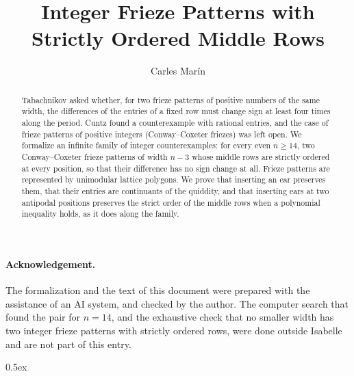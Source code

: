 \documentclass[10pt,a4paper]{article}
\begin{document}
\title{Integer Frieze Patterns with Strictly Ordered Middle Rows}
\author{Carles Mar\'in}
\maketitle

\begin{abstract}
Tabachnikov asked whether, for two frieze patterns of positive numbers of the same width, the differences
of the entries of a fixed row must change sign at least four times along the period. Cuntz found a
counterexample with rational entries, and the case of frieze patterns of positive integers
(Conway--Coxeter friezes) was left open. We formalize an infinite family of integer counterexamples: for
every even $n \geq 14$, two Conway--Coxeter frieze patterns of width $n - 3$ whose middle rows are strictly
ordered at every position, so that their difference has no sign change at all. Frieze patterns are
represented by unimodular lattice polygons. We prove that inserting an ear preserves them, that their
entries are continuants of the quiddity, and that inserting ears at two antipodal positions preserves the
strict order of the middle rows when a polynomial inequality holds, as it does along the family.
\end{abstract}

\paragraph{Acknowledgement.} The formalization and the text of this document were prepared with the
assistance of an AI system, and checked by the author. The computer search
that found the pair for $n = 14$, and the exhaustive check that no smaller width has two integer frieze
patterns with strictly ordered rows, were done outside Isabelle and are not part of this entry.

\tableofcontents



\parindent 0pt\parskip 0.5ex





\end{document}
